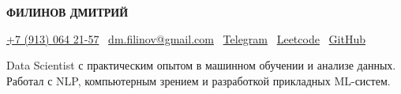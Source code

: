 
\begin{center}
  {\huge\rmfamily\bfseries ФИЛИНОВ ДМИТРИЙ}
\end{center}
\begin{center}
\href{tel:+79130642157}{+7 (913) 064 21-57} \textbar\ 
\href{mailto:dm.filinov@gmail.com}{dm.filinov@gmail.com} \textbar\
  \href{https://t.me/D1ffic00lt}{Telegram} \textbar\ 
  \href{https://leetcode.com/u/D1ffic00lt/}{Leetcode} \textbar\ 
  \href{https://github.com/D1ffic00lt}{GitHub}
\end{center}
{\centering\fontsize{11pt}{13pt}\selectfont Data Scientist с практическим опытом в машинном обучении и анализе данных.\\ Работал с NLP, компьютерным зрением и разработкой прикладных ML-систем.\par}

